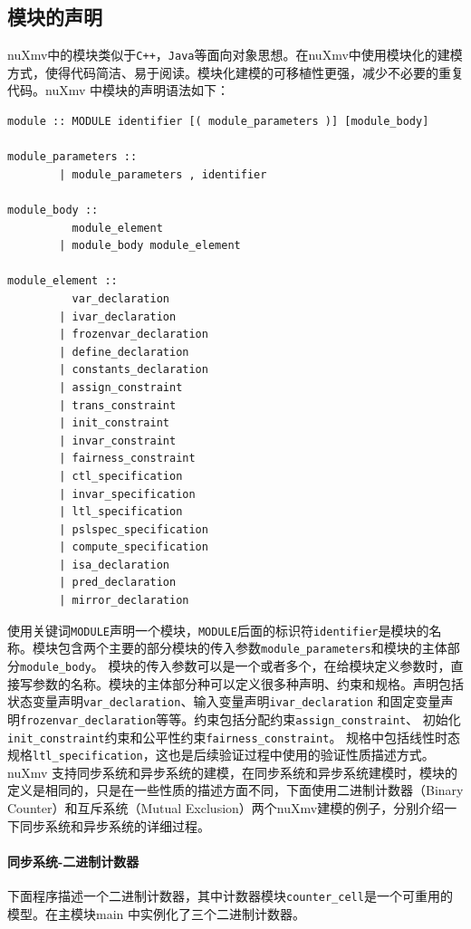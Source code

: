 \subsection{模块的声明}
nuXmv中的模块类似于\verb|C++|，\verb|Java|等面向对象思想。在nuXmv中使用模块化的建模方式，使得代码简洁、易于阅读。模块化建模的可移植性更强，减少不必要的重复代码。nuXmv 中模块的声明语法如下：

\begin{lstlisting}
module :: MODULE identifier [( module_parameters )] [module_body]

module_parameters ::
        | module_parameters , identifier

module_body ::
          module_element
        | module_body module_element

module_element ::
          var_declaration
        | ivar_declaration
        | frozenvar_declaration
        | define_declaration
        | constants_declaration
        | assign_constraint
        | trans_constraint
        | init_constraint
        | invar_constraint
        | fairness_constraint
        | ctl_specification
        | invar_specification
        | ltl_specification
        | pslspec_specification
        | compute_specification
        | isa_declaration
        | pred_declaration
        | mirror_declaration
\end{lstlisting}

使用关键词\verb|MODULE|声明一个模块，\verb|MODULE|后面的标识符\verb|identifier|是模块的名称。模块包含两个主要的部分模块的传入参数\verb|module_parameters|和模块的主体部分\verb|module_body|。 模块的传入参数可以是一个或者多个，在给模块定义参数时，直接写参数的名称。模块的主体部分种可以定义很多种声明、约束和规格。声明包括状态变量声明\verb|var_declaration|、输入变量声明\verb|ivar_declaration| 和固定变量声明\verb|frozenvar_declaration|等等。约束包括分配约束\verb|assign_constraint|、 初始化\verb|init_constraint|约束和公平性约束\verb|fairness_constraint|。 规格中包括线性时态规格\verb|ltl_specification|，这也是后续验证过程中使用的验证性质描述方式。nuXmv 支持同步系统和异步系统的建模，在同步系统和异步系统建模时，模块的定义是相同的，只是在一些性质的描述方面不同，下面使用二进制计数器（Binary Counter）和互斥系统（Mutual Exclusion）两个nuXmv建模的例子，分别介绍一下同步系统和异步系统的详细过程。

\paragraph{同步系统-二进制计数器}
下面程序描述一个二进制计数器，其中计数器模块\verb|counter_cell|是一个可重用的模型。在主模块main 中实例化了三个二进制计数器。

